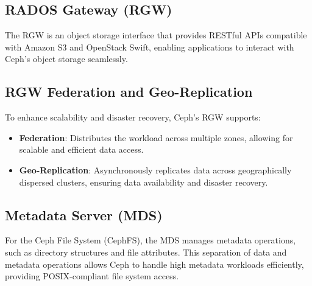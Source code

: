   

\subsection{RADOS Gateway (RGW)}

The RGW is an object storage interface that provides RESTful APIs compatible with Amazon S3 and OpenStack Swift, enabling applications to interact with Ceph's object storage seamlessly.

\subsection{RGW Federation and Geo-Replication}

To enhance scalability and disaster recovery, Ceph's RGW supports:

\begin{itemize}
    \item \textbf{Federation}: Distributes the workload across multiple zones, allowing for scalable and efficient data access.
    \item \textbf{Geo-Replication}: Asynchronously replicates data across geographically dispersed clusters, ensuring data availability and disaster recovery.
\end{itemize}

\subsection{Metadata Server (MDS)}

For the Ceph File System (CephFS), the MDS manages metadata operations, such as directory structures and file attributes. This separation of data and metadata operations allows Ceph to handle high metadata workloads efficiently, providing POSIX-compliant file system access.
